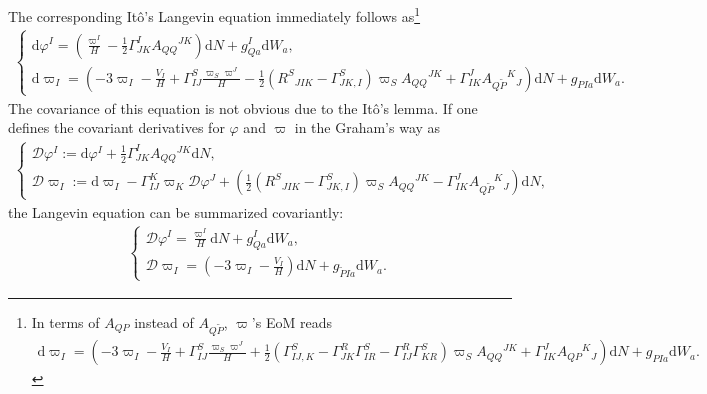 \documentclass[aps, prd
, preprint
, nofootinbib 
, longbibliography
]{revtex4-1}
\newcommand{\dd}{\mathrm{d}}
\newcommand{\dps}{\displaystyle}
\newcommand{\calD}{\mathcal{D}}
\newcommand{\bae}[1]{\begin{align} #1 \end{align}}
\newcommand{\bce}[1]{\begin{cases} #1 \end{cases}}
\begin{document}
The corresponding It\^o's Langevin equation immediately follows as\footnote{In terms of $A_{QP}$ instead of $A_{Q\tilde{P}}$, $\varpi$'s EoM reads
\bae{
    \dd\varpi_I=\left(-3\varpi_I-\frac{V_I}{H}+\Gamma^S_{IJ}\frac{\varpi_S\varpi^J}{H}+\frac{1}{2}\left(\Gamma^S_{IJ,K}-\Gamma^R_{JK}\Gamma^S_{IR}-\Gamma^R_{IJ}\Gamma^S_{KR}\right)\varpi_SA_{QQ}{}^{JK}+\Gamma^J_{IK}A_{QP}{}^K{}_J\right)\dd N+g_{PIa}\dd W_a.
}}
\bae{
	\bce{
		\dps
		\dd\varphi^I=\left(\frac{\varpi^I}{H}-\frac{1}{2}\Gamma^I_{JK}A_{QQ}{}^{JK}\right)\dd N+g^I_{Qa}\dd W_a, \\[10pt]
		\dps
		\dd\varpi_I=\left(-3\varpi_I-\frac{V_I}{H}+\Gamma^S_{IJ}\frac{\varpi_S\varpi^J}{H}
		-\frac{1}{2}\left(R^S{}_{JIK}-\Gamma^S_{JK,I}\right)\varpi_SA_{QQ}{}^{JK}+\Gamma^J_{IK}A_{Q\tilde{P}}{}^K{}_J\right)\dd N+g_{PIa}\dd W_a.
	}
}
The covariance of this equation is not obvious due to the It\^o's lemma. If one defines the covariant derivatives for $\varphi$ and $\varpi$ in the Graham's way as
\bae{\label{eq: Ito cov derivative}
	\bce{
		\dps
		\calD\varphi^I:=\dd\varphi^I+\frac{1}{2}\Gamma^I_{JK}A_{QQ}{}^{JK}\dd N, \\[10pt]
		\dps
		\calD\varpi_I:=\dd\varpi_I-\Gamma^K_{IJ}\varpi_K\calD\varphi^J
		+\left(\frac{1}{2}\left(R^S{}_{JIK}-\Gamma^S_{JK,I}\right)\varpi_SA_{QQ}{}^{JK}-\Gamma^J_{IK}A_{Q\tilde{P}}{}^K{}_J\right)\dd N,
	}
}
the Langevin equation can be summarized covariantly:
\bae{\label{eq: cov Langevin}
	\bce{
		\dps
		\calD\varphi^I=\frac{\varpi^I}{H}\dd N+g^I_{Qa}\dd W_a, \\[10pt]
		\dps
		\calD\varpi_I=\left(-3\varpi_I-\frac{V_I}{H}\right)\dd N+g_{\tilde{P}Ia}\dd W_a.
	}
}
\end{document}

